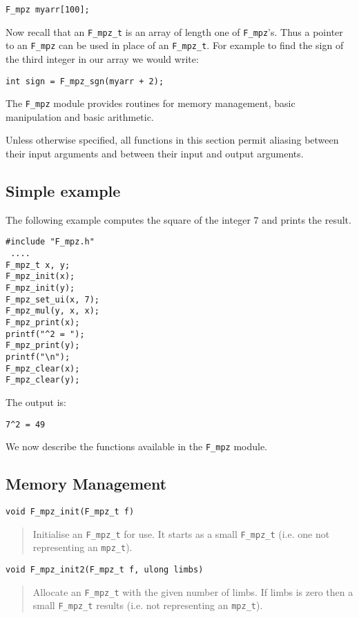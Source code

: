 \documentclass[a4paper,10pt]{article}
\newcommand{\code}{\lstinline}
\begin{document}
\code{F_mpz myarr[100];}

Now recall that an \code{F_mpz_t} is an array of length one of \code{F_mpz}'s. Thus a pointer to an \code{F_mpz} can be used in place of an \code{F_mpz_t}. For example to find the sign of the third integer in our array we would write:

\code{int sign = F_mpz_sgn(myarr + 2);}

The \code{F_mpz} module provides routines for memory management, basic manipulation and basic arithmetic.

Unless otherwise specified, all functions in this section permit aliasing between their input arguments and between their input and output arguments. 

\subsection{Simple example}

The following example computes the square of the integer 7 and prints the result.

\begin{lstlisting}
#include "F_mpz.h"
 ....
F_mpz_t x, y;
F_mpz_init(x);
F_mpz_init(y);
F_mpz_set_ui(x, 7);
F_mpz_mul(y, x, x);
F_mpz_print(x);
printf("^2 = ");
F_mpz_print(y);
printf("\n");
F_mpz_clear(x);
F_mpz_clear(y);
\end{lstlisting}

The output is:

\begin{lstlisting}
7^2 = 49
\end{lstlisting}

We now describe the functions available in the \code{F_mpz} module.

\subsection{Memory Management}

\begin{lstlisting}
void F_mpz_init(F_mpz_t f)
\end{lstlisting}
\begin{quote}
Initialise an \code{F_mpz_t} for use. It starts as a small \code{F_mpz_t} (i.e. one not representing an \code{mpz_t}).
\end{quote}

\begin{lstlisting}
void F_mpz_init2(F_mpz_t f, ulong limbs)
\end{lstlisting}
\begin{quote}
Allocate an \code{F_mpz_t} with the given number of limbs. If limbs is zero then a small \code{F_mpz_t} results (i.e. not representing an \code{mpz_t}).
\end{quote}
\end{document}
